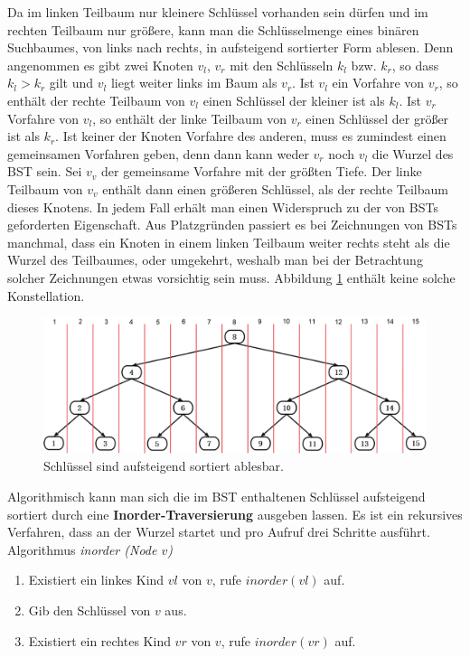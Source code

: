 \documentclass[a4paper,12pt]{article}
\begin{document}
\noindent Da im linken Teilbaum nur kleinere Schlüssel vorhanden sein dürfen und im rechten Teilbaum nur größere, kann man die Schlüsselmenge eines binären Suchbaumes, von links nach rechts, in aufsteigend sortierter Form ablesen. Denn angenommen es gibt zwei Knoten $v_l$, $v_r$ mit den Schlüsseln $k_l$ bzw. $k_r$, so dass $k_l > k_r$ gilt und $v_l$ liegt weiter links im Baum als $v_r$. Ist $v_l$ ein Vorfahre von $v_r$, so enthält der rechte Teilbaum von $v_l$ einen Schlüssel der kleiner ist als $k_l$. Ist $v_r$ Vorfahre von $v_l$, so enthält der linke Teilbaum von $v_r$ einen Schlüssel der größer ist als $k_r$. Ist keiner der Knoten Vorfahre des anderen, muss es zumindest einen gemeinsamen Vorfahren geben, denn dann kann weder $v_r$ noch $v_l$ die Wurzel des BST sein. Sei $v_v$ der gemeinsame Vorfahre mit der größten Tiefe. Der linke Teilbaum von $v_v$ enthält dann einen größeren Schlüssel, als der rechte Teilbaum dieses Knotens. In jedem Fall erhält man einen Widerspruch zu der von BSTs geforderten Eigenschaft. Aus Platzgründen passiert es bei Zeichnungen von BSTs manchmal, dass ein Knoten in einem linken Teilbaum weiter rechts steht als die Wurzel des Teilbaumes, oder umgekehrt, weshalb man bei der Betrachtung solcher Zeichnungen etwas vorsichtig sein muss. Abbildung \ref{fig:linksRechts} enthält keine solche Konstellation.  

\begin{figure}[h]
	\centering
	\includegraphics[width= 1\textwidth]{"Medien/Einleitung/linksRechts"}
	\caption{Schlüssel sind aufsteigend sortiert ablesbar. }
	\label{fig:linksRechts}
\end{figure}
\noindent Algorithmisch kann man sich die im BST enthaltenen Schlüssel aufsteigend sortiert durch eine \textbf{Inorder-Traversierung} ausgeben lassen. Es ist ein rekursives Verfahren, dass an der Wurzel startet und pro Aufruf drei Schritte ausführt.\\

Algorithmus \textit{inorder (Node $v$)}
\begin{enumerate}
	\item Existiert ein linkes Kind $\mathit{vl}$ von $v$, rufe $\mathit{inorder(vl)}$ auf. 
	\item Gib den Schlüssel von $v$ aus. 
	\item Existiert ein rechtes Kind $\mathit{vr}$ von $v$, rufe $\mathit{inorder(vr)}$ auf. 
\end{enumerate}
\end{document}

